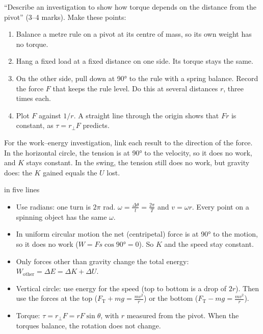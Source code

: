 \begin{examtip}
``Describe an investigation to show how torque depends on the distance from the pivot''
(3--4 marks). Make these points:
\begin{enumerate}
  \item Balance a metre rule on a pivot at its centre of mass, so its own weight has no torque.
  \item Hang a fixed load at a fixed distance on one side. Its torque stays the same.
  \item On the other side, pull down at \ang{90} to the rule with a spring balance. Record the
        force $F$ that keeps the rule level. Do this at several distances $r$, three times each.
  \item Plot $F$ against $1/r$. A straight line through the origin shows that $Fr$ is
        constant, as $\tau = r_\perp F$ predicts.
\end{enumerate}
For the work--energy investigation, link each result to the direction of the force. In the
horizontal circle, the tension is at \ang{90} to the velocity, so it does no work, and $K$ stays
constant. In the swing, the tension still does no work, but gravity does: the $K$ gained equals
the $U$ lost.
\end{examtip}

\begin{summarybox}[unbreakable]{ in five lines}
\begin{itemize}
  \item Use radians: one turn is $2\pi$ rad. $\omega = \frac{\Delta\theta}{t} = \frac{2\pi}{T}$ and
        $v = \omega r$. Every point on a spinning object has the same $\omega$.
  \item In uniform circular motion the net (centripetal) force is at \ang{90} to the motion, so
        it does no work ($W = Fs\cos\ang{90} = 0$). So $K$ and the speed stay constant.
  \item Only forces other than gravity change the total energy:
        $W_\mathrm{other} = \Delta E = \Delta K + \Delta U$.
  \item Vertical circle: use energy for the speed (top to bottom is a drop of $2r$). Then use
        the forces at the top ($F_\mathrm{T} + mg = \frac{mv^2}{r}$) or the bottom
        ($F_\mathrm{T} - mg = \frac{mv^2}{r}$).
  \item Torque: $\tau = r_\perp F = rF\sin\theta$, with $r$ measured from the pivot. When the
        torques balance, the rotation does not change.
\end{itemize}
\end{summarybox}
